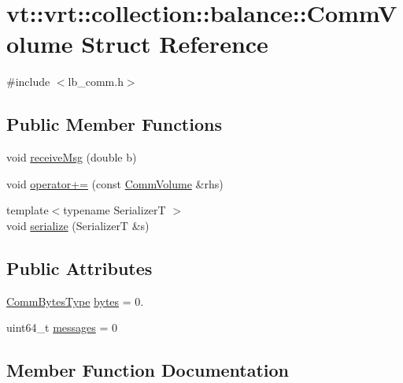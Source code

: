 \hypertarget{structvt_1_1vrt_1_1collection_1_1balance_1_1_comm_volume}{}\section{vt\+:\+:vrt\+:\+:collection\+:\+:balance\+:\+:Comm\+Volume Struct Reference}
\label{structvt_1_1vrt_1_1collection_1_1balance_1_1_comm_volume}


{\ttfamily \#include $<$lb\+\_\+comm.\+h$>$}

\subsection*{Public Member Functions}
\begin{DoxyCompactItemize}
\item 
void \hyperlink{structvt_1_1vrt_1_1collection_1_1balance_1_1_comm_volume_ad372591c42c9f37958cf7102f6716c9a}{receive\+Msg} (double b)
\item 
void \hyperlink{structvt_1_1vrt_1_1collection_1_1balance_1_1_comm_volume_a662f50c4f7d2b69195c278328337f1b0}{operator+=} (const \hyperlink{structvt_1_1vrt_1_1collection_1_1balance_1_1_comm_volume}{Comm\+Volume} \&rhs)
\item 
{\footnotesize template$<$typename SerializerT $>$ }\\void \hyperlink{structvt_1_1vrt_1_1collection_1_1balance_1_1_comm_volume_adf1418b4aa9579cf42808f5460bd16a8}{serialize} (SerializerT \&s)
\end{DoxyCompactItemize}
\subsection*{Public Attributes}
\begin{DoxyCompactItemize}
\item 
\hyperlink{namespacevt_1_1vrt_1_1collection_1_1balance_a0772d7dd137393e9874b9f8caa96d420}{Comm\+Bytes\+Type} \hyperlink{structvt_1_1vrt_1_1collection_1_1balance_1_1_comm_volume_aacaff92555b2903efc06f39223173b89}{bytes} = 0.
\item 
uint64\+\_\+t \hyperlink{structvt_1_1vrt_1_1collection_1_1balance_1_1_comm_volume_a707f9b288a607743f071dff02a42fd09}{messages} = 0
\end{DoxyCompactItemize}


\subsection{Member Function Documentation}
\mbox{\label{structvt_1_1vrt_1_1collection_1_1balance_1_1_comm_volume_a662f50c4f7d2b69195c278328337f1b0}} 
